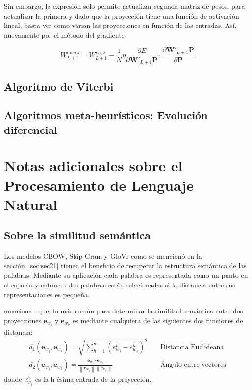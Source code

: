 Sin embargo, la expresión solo permite actualizar segunda matriz de pesos, para actualizar la primera y dado que la proyección tiene una función de activación lineal, basta ver como varian las proyecciones en función de las entradas. Así, nuevamente por el método del gradiente

\begin{equation}
	W_{L+1}^{\mbox{nuevo}} = W_{L+1}^{\mbox{viejo}} - \frac{1}{N}\eta\frac{\partial E}{\partial \mathbf{W}'_{L+1}\mathbf{P}} \cdot \frac{\partial \mathbf{W}'_{L+1}\mathbf{P}}{\partial \mathbf{P}}
\end{equation}


\subsection{Algoritmo de Viterbi}

\subsection{Algoritmos meta-heurísticos: Evolución diferencial}

\section{Notas adicionales sobre el Procesamiento de Lenguaje Natural}
\label{sec:sec25}

\subsection{Sobre la similitud semántica}
Los modelos CBOW, Skip-Gram y GloVe como se mencionó en la sección~\ref{sec:sec21} tienen el beneficio de recuperar la estructura semántica de las palabras. Mediante su aplicación cada palabra es representada como un punto en el espacio y entonces dos palabras están relacionadas si la distancia entre sus representaciones es pequeña. 

\cite{bellegarda2016state} mencionan que, lo más común para determinar la similitud semántica entre dos proyecciones $\mathbf{e}_{w_j}$ y $\mathbf{e}_{w_k}$ es mediante cualquiera de las siguientes dos funciones de distancia:
\begin{align*}
	d_1\left(\mathbf{e}_{w_j},\mathbf{e}_{w_k}\right) = \sqrt{\sum_{h=1}^p \left(e_{w_j}^h -e_{w_k}^h\right)^2} & \quad \mbox{Distancia Euclideana}\\
	d_2\left(\mathbf{e}_{w_j},\mathbf{e}_{w_k}\right) = \frac{\mathbf{e}_{w_j}\cdot \mathbf{e}_{w_k}}{\left\lVert\mathbf{e}_{w_j}\right\rVert\left\lVert\mathbf{e}_{w_k}\right\rVert} & \quad \mbox{Ángulo entre vectores}
\end{align*}
donde $e_{w_j}^h$ es la h-ésima entrada de la proyección.

